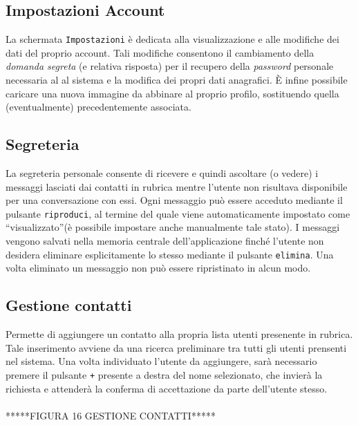 \subsection{Impostazioni Account}
La schermata \texttt{Impostazioni} è dedicata alla visualizzazione e alle modifiche dei dati del proprio account. Tali modifiche consentono il cambiamento della \textit{domanda segreta} (e relativa risposta) per il recupero della \textit{password} personale necessaria al \underline{} al sistema e la modifica dei propri dati anagrafici.
È infine possibile caricare una nuova immagine da abbinare al proprio profilo, sostituendo quella (eventualmente) precedentemente associata.

 
\subsection{Segreteria}
La segreteria personale consente di ricevere e quindi ascoltare (o vedere) i messaggi lasciati dai contatti in rubrica mentre l'utente non risultava disponibile per una conversazione con essi.
Ogni messaggio può essere acceduto mediante il pulsante \texttt{riproduci}, al termine del quale viene automaticamente impostato come ``visualizzato''(è possibile impostare anche manualmente tale stato).
I messaggi vengono salvati nella memoria centrale dell'applicazione \caName{} finché l'utente non desidera eliminare esplicitamente lo stesso mediante il pulsante \texttt{elimina}. Una volta eliminato un messaggio non può essere ripristinato in alcun modo.

\subsection{Gestione contatti}
Permette di aggiungere un contatto alla propria lista utenti presenente in rubrica. Tale inserimento avviene da una ricerca preliminare tra tutti gli utenti prensenti nel sistema. Una volta individuato l'utente da aggiungere, sarà necessario premere il pulsante \texttt{+} presente a destra del nome selezionato, che invierà la richiesta e attenderà la conferma di accettazione da parte dell'utente stesso.
\\\\*****FIGURA 16 GESTIONE CONTATTI*****

